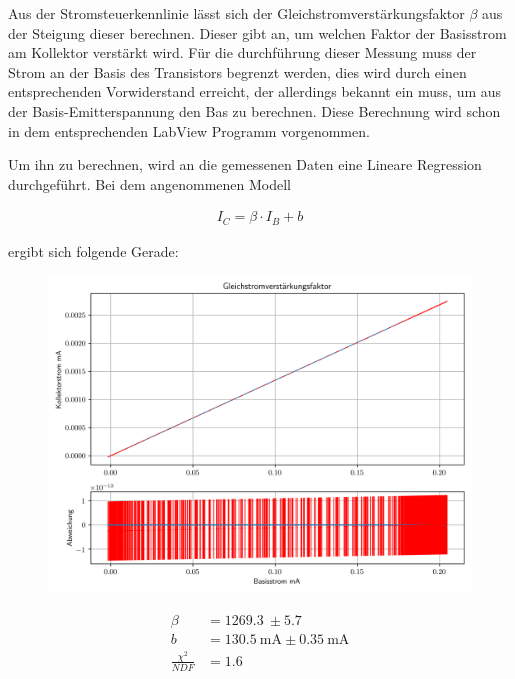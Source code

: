\documentclass[12pt,twoside,a4paper]{scrartcl}
\begin{document}
        Aus der Stromsteuerkennlinie lässt sich der Gleichstromverstärkungsfaktor $\beta$ aus der Steigung dieser berechnen. Dieser gibt an, um welchen Faktor der Basisstrom am Kollektor verstärkt wird.
        Für die durchführung dieser Messung muss der Strom an der Basis des Transistors begrenzt werden, dies wird durch einen entsprechenden Vorwiderstand erreicht, der allerdings bekannt ein muss, um aus der Basis-Emitterspannung den Bas zu berechnen. Diese Berechnung wird schon in dem entsprechenden LabView Programm vorgenommen.

        Um ihn zu berechnen, wird an die gemessenen Daten eine Lineare Regression durchgeführt. Bei dem angenommenen Modell

        \begin{align*}
            I_C = \beta \cdot I_B + b
        \end{align*}

        ergibt sich folgende Gerade:

        \begin{figure}[H]
            \begin{minipage}{0.69 \textwidth}
                \includegraphics[width = 0.8 \textwidth]{Plots/Transistor/gsvf}
            \end{minipage}
            \begin{minipage}{0.29 \textwidth}
                \begin{align*}
                    \beta &= \SI{1269.3}{} \pm \SI{5.7}{} \\
                    b &= \SI{130.5}{\milli \ampere} \pm \SI{0.35}{\milli \ampere} \\
                    \frac{\chi^2}{NDF} &= 1.6
                \end{align*}
            \end{minipage}
        \end{figure}
\end{document}
